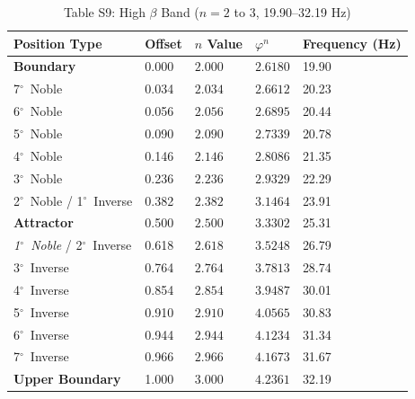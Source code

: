 \documentclass[11pt,a4paper]{article}
\newcommand{\degree}{$^\circ$}  %
\begin{document}
\begin{table}[H]
\centering
\caption*{Table S9: High $\beta$ Band ($n = 2$ to $3$, 19.90--32.19 Hz)}
\begin{tabular}{@{}lllll@{}}
\toprule
Position Type & Offset & $n$ Value & $\varphi^n$ & Frequency (Hz) \\
\midrule
\textbf{Boundary} & 0.000 & $2.000$ & $2.6180$ & 19.90 \\
7\degree\ Noble & 0.034 & $2.034$ & $2.6612$ & 20.23 \\
6\degree\ Noble & 0.056 & $2.056$ & $2.6895$ & 20.44 \\
5\degree\ Noble & 0.090 & $2.090$ & $2.7339$ & 20.78 \\
4\degree\ Noble & 0.146 & $2.146$ & $2.8086$ & 21.35 \\
3\degree\ Noble & 0.236 & $2.236$ & $2.9329$ & 22.29 \\
2\degree\ Noble / 1\degree\ Inverse & 0.382 & $2.382$ & $3.1464$ & 23.91 \\
\textbf{Attractor} & 0.500 & $2.500$ & $3.3302$ & 25.31 \\
\textit{1\degree\ Noble} / 2\degree\ Inverse & 0.618 & $2.618$ & $3.5248$ & 26.79 \\
3\degree\ Inverse & 0.764 & $2.764$ & $3.7813$ & 28.74 \\
4\degree\ Inverse & 0.854 & $2.854$ & $3.9487$ & 30.01 \\
5\degree\ Inverse & 0.910 & $2.910$ & $4.0565$ & 30.83 \\
6\degree\ Inverse & 0.944 & $2.944$ & $4.1234$ & 31.34 \\
7\degree\ Inverse & 0.966 & $2.966$ & $4.1673$ & 31.67 \\
\textbf{Upper Boundary} & 1.000 & $3.000$ & $4.2361$ & 32.19 \\
\bottomrule
\end{tabular}
\end{table}
\end{document}
